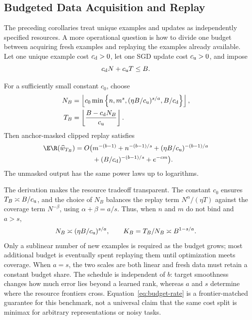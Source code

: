 \subsection{Budgeted Data Acquisition and Replay}

The preceding corollaries treat unique examples and updates as independently
specified resources. A more operational question is how to divide one budget
between acquiring fresh examples and replaying the examples already available.
Let one unique example cost $c_{\rm d}>0$, let one SGD update cost
$c_{\rm u}>0$, and impose
\begin{equation}
 c_{\rm d}N+c_{\rm u}T\le B.
 \label{eq:budget-constraint}
\end{equation}

\begin{corollary}
\label{cor:budget}
For a sufficiently small constant $c_0$, choose
\begin{align}
N_B&=\left\lfloor c_0\min\left\{
 n,m^s,(\eta B/c_{\rm u})^{s/a},B/c_{\rm d}
 \right\}\right\rfloor,\nonumber\\
T_B&=\left\lfloor\frac{B-c_{\rm d}N_B}{c_{\rm u}}\right\rfloor.
\label{eq:budget-schedule}
\end{align}
Then anchor-masked clipped replay satisfies
\begin{align}
\E\R(\widehat w_{T_B})=O\bigl(&m^{-(b-1)}+n^{-(b-1)/s}
 +(\eta B/c_{\rm u})^{-(b-1)/a}\nonumber\\
&+(B/c_{\rm d})^{-(b-1)/s}+e^{-cm}\bigr).
\label{eq:budget-rate}
\end{align}
The unmasked output has the same power laws up to logarithms.
\end{corollary}

The derivation makes the resource tradeoff transparent. The constant $c_0$
ensures $T_B\asymp B/c_{\rm u}$, and the choice of $N_B$ balances the replay
term $N^\alpha/(\eta T)$ against the coverage term $N^{-\beta}$, using
$\alpha+\beta=a/s$. Thus, when $n$ and $m$ do not bind and $a>s$,
\begin{equation}
 N_B\asymp(\eta B/c_{\rm u})^{s/a},\qquad
 K_B=T_B/N_B\asymp B^{1-s/a}.
 \label{eq:budget-interpretation}
\end{equation}
Only a sublinear number of new examples is required as the budget grows; most
additional budget is eventually spent replaying them until optimization meets
coverage. When $a=s$, the two scales are both linear and fresh data must retain
a constant budget share. The schedule is independent of $b$: target smoothness
changes how much error lies beyond a learned rank, whereas $a$ and $s$ determine
where the resource frontiers cross. Equation~\eqref{eq:budget-rate} is a
frontier-matched guarantee for this benchmark, not a universal claim that the
same cost split is minimax for arbitrary representations or noisy tasks.
